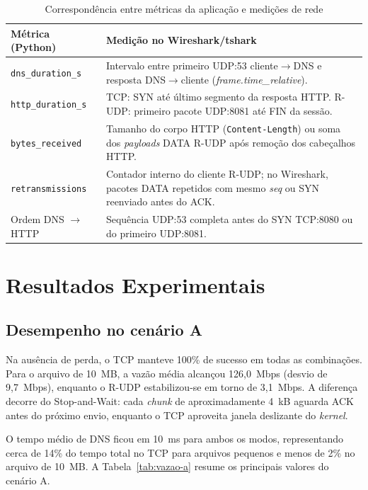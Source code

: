 \documentclass[12pt]{article}
\begin{document}
\begin{table}[!htb]
  \centering
  \caption{Correspondência entre métricas da aplicação e medições de rede}
  \label{tab:validacao}
  \small
  \begin{tabularx}{\linewidth}{|p{3.2cm}|X|}
    \hline
    \textbf{Métrica (Python)} & \textbf{Medição no Wireshark/tshark} \\
    \hline
    \texttt{dns\_duration\_s} &
    Intervalo entre primeiro UDP:53 cliente$\rightarrow$DNS e resposta
    DNS$\rightarrow$cliente (\emph{frame.time\_relative}). \\
    \hline
    \texttt{http\_duration\_s} &
    TCP: SYN até último segmento da resposta HTTP.
    R-UDP: primeiro pacote UDP:8081 até FIN da sessão. \\
    \hline
    \texttt{bytes\_received} &
    Tamanho do corpo HTTP (\texttt{Content-Length}) ou soma dos
    \emph{payloads} DATA R-UDP após remoção dos cabeçalhos HTTP. \\
    \hline
    \texttt{retransmissions} &
    Contador interno do cliente R-UDP; no Wireshark, pacotes DATA repetidos
    com mesmo \emph{seq} ou SYN reenviado antes do ACK. \\
    \hline
    Ordem DNS $\rightarrow$ HTTP &
    Sequência UDP:53 completa antes do SYN TCP:8080 ou do primeiro UDP:8081. \\
    \hline
  \end{tabularx}
\end{table}

\section{Resultados Experimentais}

\subsection{Desempenho no cenário A}

Na ausência de perda, o TCP manteve 100\% de sucesso em todas as combinações.
Para o arquivo de 10~MB, a vazão média alcançou 126,0~Mbps (desvio de 9,7~Mbps),
enquanto o R-UDP estabilizou-se em torno de 3,1~Mbps. A diferença decorre do
Stop-and-Wait: cada \emph{chunk} de aproximadamente 4~kB aguarda ACK antes do
próximo envio, enquanto o TCP aproveita janela deslizante do \emph{kernel}.

O tempo médio de DNS ficou em 10~ms para ambos os modos, representando cerca de
14\% do tempo total no TCP para arquivos pequenos e menos de 2\% no arquivo de
10~MB. A Tabela~\ref{tab:vazao-a} resume os principais valores do cenário A.
\end{document}
